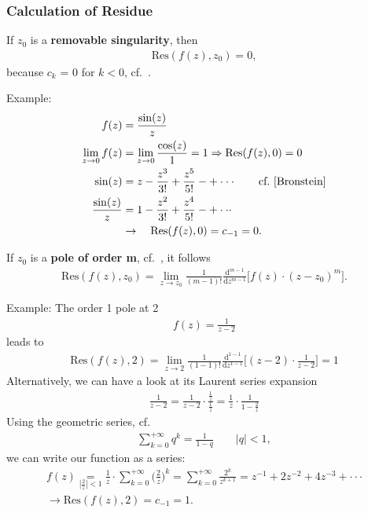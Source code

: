 \subsubsection{Calculation of Residue}
If $z_0$ is a \textbf{removable singularity}, then
\begin{align}
	\mathrm{Res}(f(z),z_0)=0,
\end{align}
because $c_k$ = 0 for $k<0$, cf.~\cite{Fritzsche2019}.

\noindent Example:
\begin{align}
	f(z) &= \frac{\sin(z)}{z} \nonumber \\
	\lim\limits_{z \rightarrow 0}f(z) &= \lim\limits_{z \rightarrow 0}\frac{\cos(z)}{1}=1 \Rightarrow \mathrm{Res}(f(z),0)=0 \nonumber \\
	\sin(z) &= z-\frac{z^3}{3!}+\frac{z^5}{5!}-+\cdot\cdot\cdot\quad \quad \textrm{cf.~\cite{Bronstein}} \nonumber \\
	\frac{\sin(z)}{z} &= 1 - \frac{z^2}{3!}+\frac{z^4}{5!}-+\cdot\cdot\cdot \nonumber \\
	&\rightarrow \quad \mathrm{Res}(f(z),0)=c_{-1} = 0. \nonumber
\end{align}

\noindent If $z_0$ is a \textbf{pole of order m}, cf.~\cite{Fritzsche2019}, it follows
\begin{align}
\label{eq:ResTheorem_pole_order_m}
	\mathrm{Res}(f(z),z_0)=\lim\limits_{z \rightarrow z_0}\frac{1}{(m-1)!}\frac{\mathrm{d}^{m-1}}{\mathrm{d} z^{m-1}}\bigg [f(z)\cdot (z-z_0)^m\bigg ].
\end{align}

\noindent Example: The order 1 pole at 2
\begin{align}
	f(z) = \frac{1}{z-2} \nonumber
\end{align}
leads to
\begin{align}
	\mathrm{Res}(f(z),2)=\lim\limits_{z\rightarrow 2}\frac{1}{(1-1)!}\frac{\mathrm{d}^{1-1}}{\mathrm{d}z^{1-1}}\bigg [(z-2)\cdot\frac{1}{z-2}\bigg ] = 1 \nonumber
\end{align}
Alternatively, we can have a look at its Laurent series expansion
\begin{align}
	\frac{1}{z-2}=\frac{1}{z-2}\cdot\frac{\frac{1}{z}}{\frac{1}{z}}=\frac{1}{z}\cdot\frac{1}{1-\frac{2}{z}} \nonumber
\end{align}
Using the geometric series, cf.~\cite{Bronstein}
\begin{align}
	\sum_{k=0}^{+\infty}q^k=\frac{1}{1-q}\quad\quad|q| < 1 \nonumber,
\end{align}
we can write our function as a series:
\begin{align}
	f(z)\underset{|\frac{2}{z}|<1}{=}\frac{1}{z}\cdot\sum_{k=0}^{+\infty}\bigg (\frac{2}{z}\bigg )^k = \sum_{k=0}^{+\infty}\frac{2^k}{z^{k+1}} = z^{-1}+2z^{-2}+4z^{-3}+\cdot\cdot\cdot \nonumber \\
	\rightarrow \mathrm{Res}(f(z),2)=c_{-1}=1. \nonumber
\end{align}

